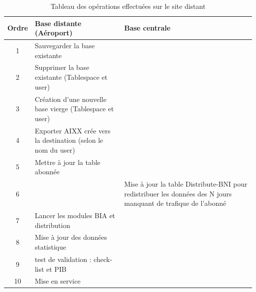 \begin{table}[!h]
\begin{center}
\begin{tabularx}{17cm}{|c|p{7.5cm}|X|}
  \hline
  \textbf{Ordre} & \textbf{Base distante (Aéroport)} & \textbf{Base centrale} \\ \hline
  1 & Sauvegarder la base existante & \\ \hline
  2 & Supprimer la base existante (Tablespace et user) & \\ \hline
  3 & Création d'une nouvelle base vierge (Tablespace et user) & \\ \hline
  4 & Exporter AIXX crée vers la destination (selon le nom du user) & \\ \hline
  5 & Mettre à jour la table abonnée & \\ \hline
  6 & & Mise à jour la table Distribute-BNI pour redistribuer les données des N jours manquant de trafique de l'abonné \\ \hline
  7 & Lancer les modules BIA et distribution &  \\ \hline
  8 & Mise à jour des données statistique & \\ \hline
  9 & test de validation : check-list et PIB & \\ \hline
  10 & Mise en service & \\ \hline

\end{tabularx}
\end{center}
\caption{Tableau des opérations effectuées sur le site distant}
\end{table}
\newpage
